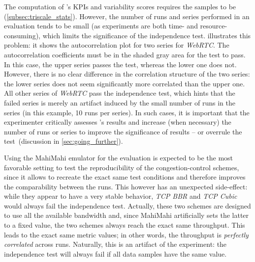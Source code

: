 The computation of \triscale's KPIs and variability scores requires the samples to be \iid (\cref{subsec:triscale_stats}).
However, the number of runs and series performed in an evaluation tends to be small (as experiments are both time- and resource-consuming), which limits the significance of the independence test.
 illustrates this problem: it shows the autocorrelation plot for two series for \textit{WebRTC}.
The autocorrelation coefficients must be in the shaded gray area for the test to pass.
In this case, the upper series passes the test, whereas the lower one does not.
However, there is no clear difference in the correlation structure of the two series: the lower series does not seem significantly more correlated than the upper one.
All other series of \textit{WebRTC} pass the independence test, which hints that the failed series is merely an artifact induced by the small number of runs in the series (in this example, 10 runs per series).
In such cases, it is important that the experimenter critically assesses \triscale's results and increase (when necessary) the number of runs or series to improve the significance of results -- or overrule the test~(discussion in \cref{sec:going_further}).

Using the MahiMahi emulator for the evaluation is expected to be the most favorable setting to test the reproducibility of the congestion-control schemes, since it allows to recreate the exact same test conditions and therefore improves the comparability between the runs.
This however has an unexpected side-effect: while they appear to have a very stable behavior, \emph{TCP BBR} and \emph{TCP Cubic} would always fail the independence test. Actually, these two schemes are designed to use all the available bandwidth and, since MahiMahi artificially sets the latter to a fixed value, the two schemes always reach the exact same throughput.
This leads to the exact same metric values; in other words, the throughput is \emph{perfectly correlated} across runs.
Naturally, this is an artifact of the experiment: the independence test will always fail if all data samples have the same value.


